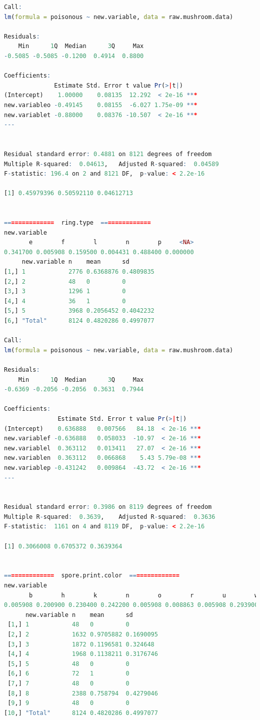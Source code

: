 \documentclass[12pt]{article}
\begin{document}
\begin{lstlisting}[language = R]
Call:
lm(formula = poisonous ~ new.variable, data = raw.mushroom.data)

Residuals:
    Min      1Q  Median      3Q     Max 
-0.5085 -0.5085 -0.1200  0.4914  0.8800 

Coefficients:
              Estimate Std. Error t value Pr(>|t|)    
(Intercept)    1.00000    0.08135  12.292  < 2e-16 ***
new.variableo -0.49145    0.08155  -6.027 1.75e-09 ***
new.variablet -0.88000    0.08376 -10.507  < 2e-16 ***
---


Residual standard error: 0.4881 on 8121 degrees of freedom
Multiple R-squared:  0.04613,	Adjusted R-squared:  0.04589 
F-statistic: 196.4 on 2 and 8121 DF,  p-value: < 2.2e-16

[1] 0.45979396 0.50592110 0.04612713


==============  ring.type  ==============
new.variable
       e        f        l        n        p     <NA> 
0.341700 0.005908 0.159500 0.004431 0.488400 0.000000 
     new.variable n    mean      sd       
[1,] 1            2776 0.6368876 0.4809835
[2,] 2            48   0         0        
[3,] 3            1296 1         0        
[4,] 4            36   1         0        
[5,] 5            3968 0.2056452 0.4042232
[6,] "Total"      8124 0.4820286 0.4997077

Call:
lm(formula = poisonous ~ new.variable, data = raw.mushroom.data)

Residuals:
    Min      1Q  Median      3Q     Max 
-0.6369 -0.2056 -0.2056  0.3631  0.7944 

Coefficients:
               Estimate Std. Error t value Pr(>|t|)    
(Intercept)    0.636888   0.007566   84.18  < 2e-16 ***
new.variablef -0.636888   0.058033  -10.97  < 2e-16 ***
new.variablel  0.363112   0.013411   27.07  < 2e-16 ***
new.variablen  0.363112   0.066868    5.43 5.79e-08 ***
new.variablep -0.431242   0.009864  -43.72  < 2e-16 ***
---


Residual standard error: 0.3986 on 8119 degrees of freedom
Multiple R-squared:  0.3639,	Adjusted R-squared:  0.3636 
F-statistic:  1161 on 4 and 8119 DF,  p-value: < 2.2e-16

[1] 0.3066008 0.6705372 0.3639364


==============  spore.print.color  ==============
new.variable
       b        h        k        n        o        r        u        w        y     <NA> 
0.005908 0.200900 0.230400 0.242200 0.005908 0.008863 0.005908 0.293900 0.005908 0.000000 
      new.variable n    mean      sd       
 [1,] 1            48   0         0        
 [2,] 2            1632 0.9705882 0.1690095
 [3,] 3            1872 0.1196581 0.324648 
 [4,] 4            1968 0.1138211 0.3176746
 [5,] 5            48   0         0        
 [6,] 6            72   1         0        
 [7,] 7            48   0         0        
 [8,] 8            2388 0.758794  0.4279046
 [9,] 9            48   0         0        
[10,] "Total"      8124 0.4820286 0.4997077


\end{lstlisting}
\end{document}
